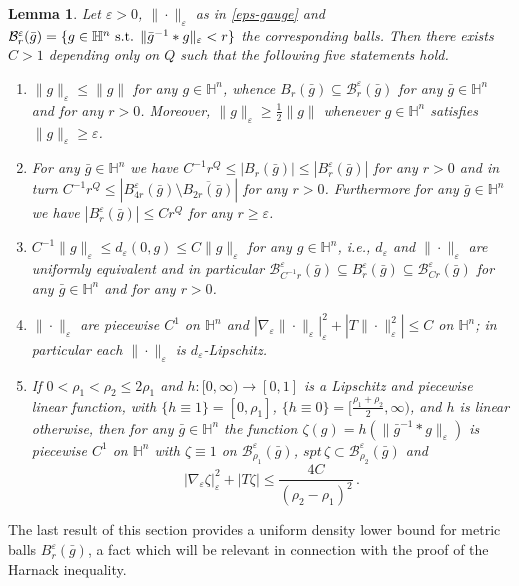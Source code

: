 \documentclass[10pt]{amsart}
\numberwithin{equation}{section}
\newtheorem{lemma}[theorem]{Lemma}
\theoremstyle{definition}
\newcommand{\He}{\mathbb{H}}
\begin{document}
\begin{lemma}
\label{lemma:eps-gauge}
Let $\varepsilon>0$, $\| \cdot \|_\varepsilon$ as in \eqref{eps-gauge} and $\mathcal{B}^\varepsilon_r(\bar{g})=\{ g \in \He^n \hbox{ s.t. } \| \bar{g}^{-1}* g\|_\varepsilon<r \}$ the corresponding balls. Then there exists $C>  1$ depending only on $Q$ such that the following five statements hold.
\begin{enumerate}
\item $\| g\|_\varepsilon \leq \| g\|$ for any $g \in \He^n$, whence $B_r(\bar{g}) \subseteq \mathcal{B}^\varepsilon_{r}(\bar{g})  $ for any $\bar{g} \in \He^n$ and for any $r>0$. Moreover, $\|g \|_\varepsilon \geq \frac12 \|g\|$ whenever $g \in \He^n$ satisfies $\|g\|_\varepsilon \geq \varepsilon$.
\item For any $\bar{g} \in \He^n$ we have $C^{-1} r^Q\leq  |B_r(\bar{g}) | \leq | B^\varepsilon_r(\bar{g})|$ for any $r>0$ and in turn $C^{-1} r^Q\leq   | B^\varepsilon_{4r}(\bar{g})\setminus \overline{B_{2r}(\bar{g})}|$ for any $r>0$. Furthermore  for any $\bar{g}\in \He^n$ we have $| B^\varepsilon_r(\bar{g})| \leq C r^Q$ for any $r\geq \varepsilon$.
\item $\displaystyle{ C^{-1} \| g \|_\varepsilon \leq d_\varepsilon (0,g) \leq C \| g\|_\varepsilon}$ for any $g \in \He^n$, i.e., $d_\varepsilon$ and $\| \cdot\|_\varepsilon$  are uniformly equivalent and in particular $\mathcal{B}^\varepsilon_{C^{-1}r}(\bar{g}) \subseteq B^\varepsilon_r(\bar{g}) \subseteq \mathcal{B}^\varepsilon_{Cr}(\bar{g})$ for any $\bar{g} \in \He^n$ and for any $r>0$.
\item $\| \cdot\|_\varepsilon $ are piecewise $C^1$ on $\He^n$ and  $\displaystyle{ |\nabla_\varepsilon \| \cdot \|_\varepsilon|_\varepsilon^2 }+\left| T \| \cdot \|^2_\varepsilon \right| \leq C$ on $\He^n$; in particular each $\| \cdot\|_\varepsilon$ is $d_\varepsilon$-Lipschitz. 
\item If $0<\rho_1<\rho_2\leq 2 \rho_1$ and $h: [0,\infty) \to [0,1]$ is a Lipschitz and piecewise linear function, with $\{ h \equiv 1\}=[0,\rho_1]$, $\{ h \equiv 0\}=[\frac{\rho_1+\rho_2}2, \infty)$, and $h$ is linear otherwise, then for any $\bar{g} \in \He^n$ the function $\zeta (g)=h (\| \bar{g}^{-1}*g \|_\varepsilon)$ is piecewise $C^1$ on $\He^n$ with $\zeta \equiv 1$ on $\mathcal{B}^\varepsilon_{\rho_1}(\bar{g})$, $spt \,\zeta \subset \mathcal{B}^\varepsilon_{\rho_2}(\bar{g})$ and
\begin{equation}
\label{cut-off-bounds}
| \nabla_\varepsilon  \zeta |_\varepsilon^2 +\left| T  \zeta \right| \leq \frac{4C}{(\rho_2-\rho_1)^2} \, .
\end{equation}
\end{enumerate}
\end{lemma}
The last result of this section provides a uniform density lower bound for
metric balls $B^\varepsilon_r(\bar{g})$, a fact which will be relevant in connection with the proof of the Harnack inequality.
\end{document}
